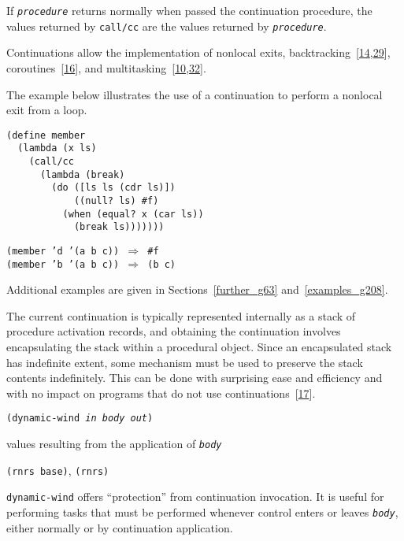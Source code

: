 If \texttt{\textit{procedure}} returns normally when passed the continuation procedure,
the values returned by \texttt{call/cc} are the values returned by \texttt{\textit{procedure}}.


Continuations allow the implementation of \label{control_s55}nonlocal exits,
backtracking [\hyperref[bibliography_g232]{14},\hyperref[bibliography_g247]{29}],
coroutines [\hyperref[bibliography_g234]{16}], and
multitasking [\hyperref[bibliography_g228]{10},\hyperref[bibliography_g250]{32}].


The example below illustrates the use of a continuation to perform
a nonlocal exit from a loop.


\begin{alltt}
(define member
  (lambda (x ls)
    (call/cc
      (lambda (break)
        (do ([ls ls (cdr ls)])
            ((null? ls) \#{}f)
          (when (equal? x (car ls))
            (break ls)))))))

(member 'd '(a b c)) \(\Rightarrow\) \#{}f
(member 'b '(a b c)) \(\Rightarrow\) (b c)
\end{alltt}


Additional examples are given in Sections \ref{further_g63}
and \ref{examples_g208}.


The current continuation is typically represented internally as a stack
of procedure activation records, and obtaining the continuation
involves encapsulating the stack within a procedural object.
Since an encapsulated stack has indefinite extent, some mechanism must
be used to preserve the stack contents indefinitely.
This can be done with surprising ease and efficiency and with no impact
on programs that do not use continuations [\hyperref[bibliography_g235]{17}].

\begin{description}

\label{control_s56}\label{control_desc_dynamic_wind}
\item[procedure] \texttt{(dynamic-wind \textit{in} \textit{body} \textit{out})}



\item[returns] values resulting from the application of \texttt{\textit{body}}


\item[libraries] \texttt{(rnrs base)}, \texttt{(rnrs)}
\end{description}


\label{control_s57}\texttt{dynamic-wind} offers ``protection'' from continuation
invocation.
It is useful for performing tasks that must be performed whenever control
enters or leaves \texttt{\textit{body}}, either normally or by continuation application.


